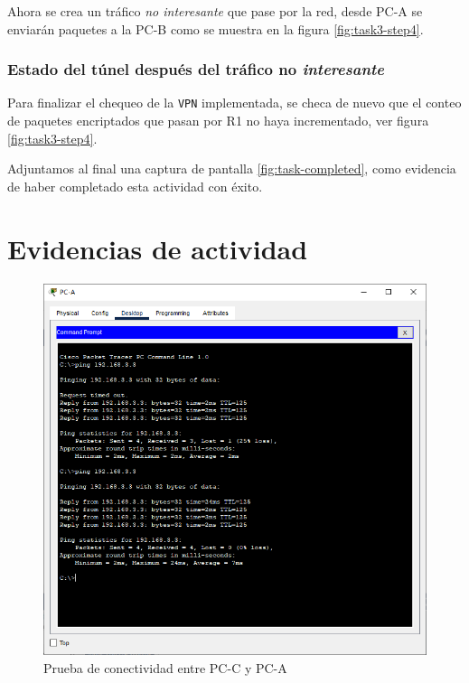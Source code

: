 \documentclass{article}
\begin{document}
                Ahora se crea un tráfico \emph{no interesante} que pase por la red, desde PC-A se enviarán paquetes a la PC-B como se muestra en la figura \ref{fig:task3-step4}.

            \subsubsection{Estado del túnel después del tráfico no \emph{interesante}}

                Para finalizar el chequeo de la \texttt{VPN} implementada, se checa de nuevo que el conteo de paquetes encriptados que pasan por R1 no haya incrementado, ver figura \ref{fig:task3-step4}.
        
        Adjuntamos al final una captura de pantalla \ref{fig:task-completed}, como evidencia de haber completado esta actividad con éxito.

    \clearpage
    \appendix
    \section{Evidencias de actividad}

        \begin{figure}[!h]
            \centering
            \includegraphics[scale=0.45]{img/task1-step1.png}
            \caption{Prueba de conectividad entre PC-C y PC-A}
            \label{fig:task1-step1}
        \end{figure}
\end{document}
